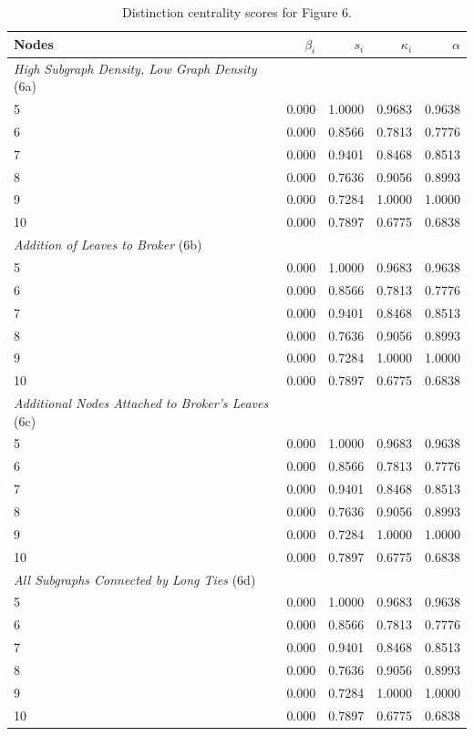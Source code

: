 \begin{table}
\footnotesize
\centering
\caption{\label{tab:fig6-star}Distinction centrality scores for Figure 6.}
\centering
\begin{tabular}[t]{lrrrr}
Nodes & $\beta_i$ & $s_i$ & $\kappa_i$ & $\alpha$\\
\toprule
\midrule
\textit{High Subgraph Density, Low Graph Density} (6a)\\
5 & 0.000 & 1.0000 & 0.9683 & 0.9638\\
6 & 0.000 & 0.8566 & 0.7813 & 0.7776\\
7 & 0.000 & 0.9401 & 0.8468 & 0.8513\\
8 & 0.000 & 0.7636 & 0.9056 & 0.8993\\
9 & 0.000 & 0.7284 & 1.0000 & 1.0000\\
10 & 0.000 & 0.7897 & 0.6775 & 0.6838\\
\midrule
\midrule
\textit{Addition of Leaves to Broker} (6b)\\
5 & 0.000 & 1.0000 & 0.9683 & 0.9638\\
6 & 0.000 & 0.8566 & 0.7813 & 0.7776\\
7 & 0.000 & 0.9401 & 0.8468 & 0.8513\\
8 & 0.000 & 0.7636 & 0.9056 & 0.8993\\
9 & 0.000 & 0.7284 & 1.0000 & 1.0000\\
10 & 0.000 & 0.7897 & 0.6775 & 0.6838\\
\midrule
\midrule
\textit{Additional Nodes Attached to Broker's Leaves} (6c)\\
5 & 0.000 & 1.0000 & 0.9683 & 0.9638\\
6 & 0.000 & 0.8566 & 0.7813 & 0.7776\\
7 & 0.000 & 0.9401 & 0.8468 & 0.8513\\
8 & 0.000 & 0.7636 & 0.9056 & 0.8993\\
9 & 0.000 & 0.7284 & 1.0000 & 1.0000\\
10 & 0.000 & 0.7897 & 0.6775 & 0.6838\\
\midrule
\midrule
\textit{All Subgraphs Connected by Long Ties} (6d)\\
5 & 0.000 & 1.0000 & 0.9683 & 0.9638\\
6 & 0.000 & 0.8566 & 0.7813 & 0.7776\\
7 & 0.000 & 0.9401 & 0.8468 & 0.8513\\
8 & 0.000 & 0.7636 & 0.9056 & 0.8993\\
9 & 0.000 & 0.7284 & 1.0000 & 1.0000\\
10 & 0.000 & 0.7897 & 0.6775 & 0.6838\\
\bottomrule
\bottomrule
\end{tabular}
\end{table}